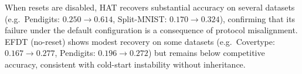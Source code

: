 \documentclass{article}
\newcommand{\mist}{\textsc{Mist}}
\begin{document}
When resets are disabled, HAT recovers substantial accuracy on several
datasets (e.g.\ Pendigits: $0.250 \to 0.614$, Split-MNIST: $0.170 \to 0.324$),
confirming that its failure under the default configuration is a consequence
of protocol misalignment. EFDT (no-reset) shows modest recovery on some
datasets (e.g.\ Covertype: $0.167 \to 0.277$, Pendigits: $0.196 \to 0.272$)
but remains below competitive accuracy, consistent with cold-start instability
without inheritance.
\end{document}
